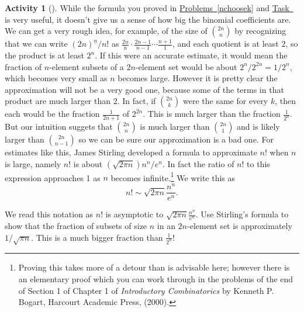 \documentclass[10pt,]{book}
\theoremstyle{plain}
\theoremstyle{definition}
\newtheorem{activity}[project]{Activity}
\numberwithin{equation}{chapter}
\begin{document}
\begin{activity}[]\label{Stirling_sapproximation}
While the formula you proved in \hyperref[nchoosek]{Problems~\ref{nchoosek}} and \hyperref[formulanchoosekfinal]{Task~} is very useful, it doesn't give us a sense of how big the binomial coefficients are. We can get a very rough idea, for example, of the size of \(\binom{2n}{n}\) by recognizing that we can write \((2n)^{\underline{n}}/n!\) as \(\frac{2n}{n}\cdot
\frac{2n-1}{n-1}\cdots \frac{n+1}{1}\), and each quotient is at least \(2\), so the product is at least \(2^n\). If this were an accurate estimate, it would mean the fraction of \(n\)-element subsets of a \(2n\)-element set would be about \(2^n/2^{2n}=1/2^n\), which becomes very small as \(n\) becomes large. However it is pretty clear the approximation will not be a very good one, because some of the terms in that product are much larger than 2. In fact, if \(\binom{2n}{k}\) were the same for every \(k\), then each would be the fraction \(\frac{1}{2n+1}\) of \(2^{2n}\). This is much larger than the fraction \(\frac{1}{2^n}\). But our intuition suggets that \(\binom{2n}{n}\) is much larger than \(\binom{2n}{1}\) and is likely larger than \(\binom{2n}{n-1}\) so we can be sure our approximation is a bad one. For estimates like this, James Stirling developed a formula to approximate \(n!\) when \(n\) is large, namely \(n!\) is about \(\left(\sqrt{2\pi
n}\right){n^n/ e^n}\). In fact the ratio of \(n!\) to this expression approaches 1 as \(n\) becomes infinite.\footnote{Proving this takes more of a detour than is advisable here; however there is an elementary proof which you can work through in the problems of the end of Section 1 of Chapter 1 of \emph{Introductory Combinatorics} by Kenneth P. Bogart, Harcourt Academic Press, (2000).\label{fn-2}} We write this as%
\begin{equation*}
n!\sim \sqrt{2\pi
n}\frac{n^n}{e^n}.
\end{equation*}
%
\par
We read this notation as \(n!\) is asymptotic to \(\sqrt{2\pi n}\frac{n^n}{e^n}\). Use Stirling's formula to show that the fraction of subsets of size \(n\) in an \(2n\)-element set is approximately \(1/\sqrt{\pi n}\). This is a much bigger fraction than \(\frac{1}{2^n}\)!%
\end{activity}
\typeout{************************************************}
\typeout{************************************************}
\end{document}
